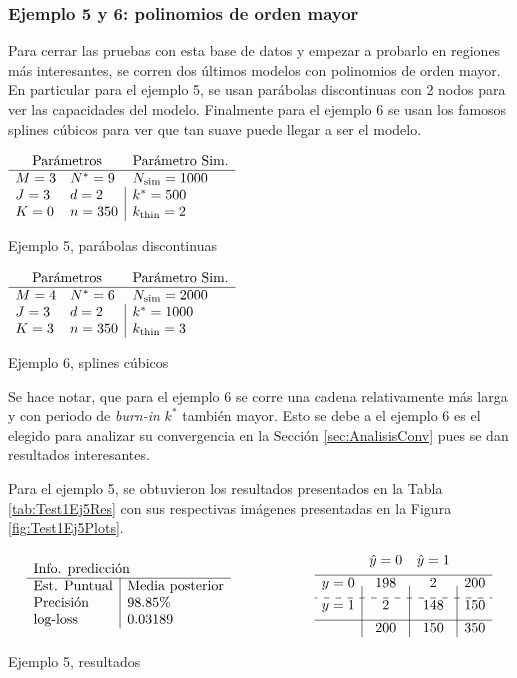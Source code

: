 \documentclass[../Main/Main.tex]{subfiles}
\begin{document}
\subsubsection*{Ejemplo 5 y 6: polinomios de orden mayor} \label{sec:Test1Ej6}
Para cerrar las pruebas con esta base de datos y empezar a probarlo en regiones más interesantes, se corren dos últimos modelos con polinomios de orden mayor. En particular para el ejemplo 5, se usan parábolas discontinuas con 2 nodos para ver las capacidades del modelo. Finalmente para el ejemplo 6 se usan los famosos splines cúbicos para ver que tan suave puede llegar a ser el modelo. 
\begin{table}
	\begin{subtable}{0.45\textwidth}
	\centering
	$\paramsmod{3}{3}{0}{9}{2}{350}{1000}{500}{2}$
	\caption{Ejemplo 5, parábolas discontinuas}
	\label{ej:5}
	\end{subtable}
	\quad
	\begin{subtable}{0.45\textwidth}
	\centering
	$\paramsmod{4}{3}{3}{6}{2}{350}{2000}{1000}{3}$	
	\caption{Ejemplo 6, splines cúbicos}
	\label{ej:6}
	\end{subtable}
\end{table}

Se hace notar, que para el ejemplo 6 se corre una cadena relativamente más larga y con periodo de \textit{burn-in} $k^*$ también mayor. Esto se debe a el ejemplo 6 es el elegido para analizar su convergencia en la Sección \ref{sec:AnalisisConv} pues se dan resultados interesantes.

Para el ejemplo 5, se obtuvieron los resultados presentados en la Tabla \ref{tab:Test1Ej5Res} con sus respectivas imágenes presentadas en la Figura \ref{fig:Test1Ej5Plots}.
\begin{table}[h]
\begin{align*}
\resultados{\text{Media posterior}}{98.85}{0.03189}
\qquad\qquad\qquad
\matconf{198}{2}{200}{2}{148}{150}{200}{150}{350}
\end{align*}
\caption{Ejemplo 5, resultados}
\label{tab:Test1Ej5Res}
\end{table}
\end{document}
